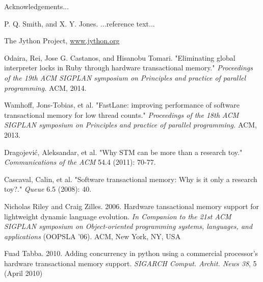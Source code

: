 \documentclass{sigplanconf}
\begin{document}




\acks

Acknowledgements...





\begin{thebibliography}{}
\softraggedright

  P. Q. Smith, and X. Y. Jones. ...reference text...

  The Jython Project, \url{www.jython.org}

  Odaira, Rei, Jose G. Castanos, and Hisanobu Tomari.  "Eliminating
  global interpreter locks in Ruby through hardware transactional
  memory."  \emph{Proceedings of the 19th ACM SIGPLAN symposium on
    Principles and practice of parallel programming.} ACM, 2014.

  Wamhoff, Jons-Tobias, et al. "FastLane: improving performance of
  software transactional memory for low thread counts."
  \emph{Proceedings of the 18th ACM SIGPLAN symposium on Principles
    and practice of parallel programming.} ACM, 2013.

  Dragojević, Aleksandar, et al. "Why STM can be more than a research
  toy." \emph{Communications of the ACM} 54.4 (2011): 70-77.

  Cascaval, Calin, et al. "Software transactional memory: Why is it
  only a research toy?." \emph{Queue} 6.5 (2008): 40.

  Nicholas Riley and Craig Zilles. 2006. Hardware tansactional memory
  support for lightweight dynamic language evolution. \emph{In
    Companion to the 21st ACM SIGPLAN symposium on Object-oriented
    programming systems, languages, and applications} (OOPSLA
  '06). ACM, New York, NY, USA

  Fuad Tabba. 2010. Adding concurrency in python using a commercial
  processor's hardware transactional memory support. \emph{SIGARCH
  Comput. Archit. News 38}, 5 (April 2010)

\end{thebibliography}
\end{document}
